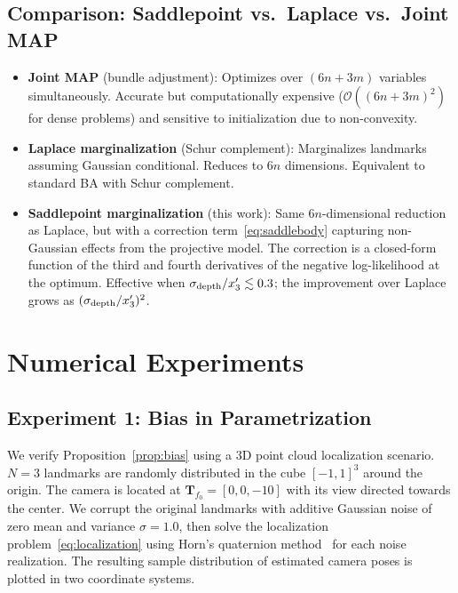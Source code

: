 \documentclass[journal]{IEEEtran}
\begin{document}
\subsection{Comparison: Saddlepoint vs.\ Laplace vs.\ Joint MAP}

\begin{itemize}
\item \textbf{Joint MAP} (bundle adjustment): 
Optimizes over $(6n + 3m)$ variables simultaneously. 
Accurate but computationally expensive ($\mathcal{O}((6n+3m)^2)$ 
for dense problems) and sensitive to initialization 
due to non-convexity.

\item \textbf{Laplace marginalization} (Schur complement): 
Marginalizes landmarks assuming Gaussian conditional. 
Reduces to $6n$ dimensions. Equivalent to standard 
BA with Schur complement.

\item \textbf{Saddlepoint marginalization} (this work): 
Same $6n$-dimensional reduction as Laplace, but with 
a correction term~\eqref{eq:saddlebody} capturing 
non-Gaussian effects from the projective model. 
The correction is a closed-form function of the 
third and fourth derivatives of the negative 
log-likelihood at the optimum.
Effective when $\sigma_{\rm depth}/x_3' \lesssim 0.3$;
the improvement over Laplace grows as 
$(\sigma_{\rm depth}/x_3')^2$.
\end{itemize}

\section{Numerical Experiments}
\label{sec:experiments}

\subsection{Experiment 1: Bias in Parametrization}

We verify Proposition~\ref{prop:bias} using a 
3D point cloud localization scenario. $N = 3$ landmarks are
randomly distributed in the cube $[-1,1]^3$ around the origin.
The camera is located at $\mathbf{T}_{f_0} = [0,0,-10]$ with 
its view directed towards the center. We corrupt the original 
landmarks with additive Gaussian noise of zero mean and 
variance $\sigma = 1.0$, then solve the localization 
problem~\eqref{eq:localization} using Horn's quaternion 
method~\cite{Horn87} for each noise realization.
The resulting sample distribution of estimated camera poses 
is plotted in two coordinate systems.
\end{document}
